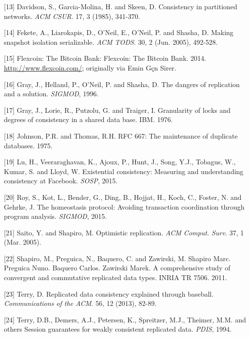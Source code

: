 \documentclass[b5paper,11pt,twoside,openright]{book}
\begin{document}
\leavevmode\hypertarget{ref-davidson-survey}{}%
{[}13{]} Davidson, S., Garcia-Molina, H. and Skeen, D. Consistency in
partitioned networks. \emph{ACM CSUR}. 17, 3 (1985), 341-370.

\leavevmode\hypertarget{ref-fekete-ssi}{}%
{[}14{]} Fekete, A., Liarokapis, D., O'Neil, E., O'Neil, P. and Shasha,
D. Making snapshot isolation serializable. \emph{ACM TODS}. 30, 2 (Jun.
2005), 492-528.

\leavevmode\hypertarget{ref-flexcoin}{}%
{[}15{]} Flexcoin: The Bitcoin Bank: Flexcoin: The Bitcoin Bank. 2014.
\url{http://www.flexcoin.com/}; originally via Emin Gçn Sirer.

\leavevmode\hypertarget{ref-gray-dangers}{}%
{[}16{]} Gray, J., Helland, P., O'Neil, P. and Shasha, D. The dangers of
replication and a solution. \emph{SIGMOD}, 1996.

\leavevmode\hypertarget{ref-gray-isolation}{}%
{[}17{]} Gray, J., Lorie, R., Putzolu, G. and Traiger, I. Granularity of
locks and degrees of consistency in a shared data base. IBM. 1976.

\leavevmode\hypertarget{ref-caprfc}{}%
{[}18{]} Johnson, P.R. and Thomas, R.H. RFC 667: The maintenance of
duplicate databases. 1975.

\leavevmode\hypertarget{ref-fb-inconsistency}{}%
{[}19{]} Lu, H., Veeraraghavan, K., Ajoux, P., Hunt, J., Song, Y.J.,
Tobagus, W., Kumar, S. and Lloyd, W. Existential consistency: Measuring
and understanding consistency at Facebook. \emph{SOSP}, 2015.

\leavevmode\hypertarget{ref-homeostasis}{}%
{[}20{]} Roy, S., Kot, L., Bender, G., Ding, B., Hojjat, H., Koch, C.,
Foster, N. and Gehrke, J. The homeostasis protocol: Avoiding transaction
coordination through program analysis. \emph{SIGMOD}, 2015.

\leavevmode\hypertarget{ref-optimistic}{}%
{[}21{]} Saito, Y. and Shapiro, M. Optimistic replication. \emph{ACM
  Comput. Surv.} 37, 1 (Mar. 2005).

\leavevmode\hypertarget{ref-crdt}{}%
{[}22{]} Shapiro, M., Preguica, N., Baquero, C. and Zawirski, M. Shapiro
Marc. Preguica Nuno. Baquero Carlos. Zawirski Marek. A comprehensive
study of convergent and commutative replicated data types. INRIA TR
7506. 2011.

\leavevmode\hypertarget{ref-terry-baseball}{}%
{[}23{]} Terry, D. Replicated data consistency explained through
baseball. \emph{Communications of the ACM}. 56, 12 (2013), 82-89.

\leavevmode\hypertarget{ref-bayou-session}{}%
{[}24{]} Terry, D.B., Demers, A.J., Petersen, K., Spreitzer, M.J.,
Theimer, M.M. and others Session guarantees for weakly consistent
replicated data. \emph{PDIS}, 1994.
\end{document}
